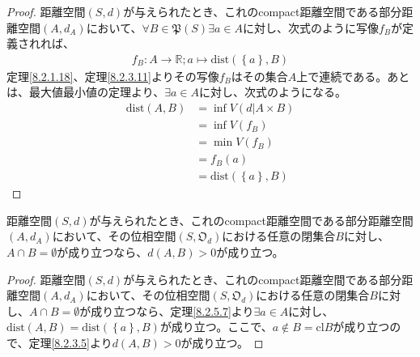 \documentclass[dvipdfmx]{jsarticle}
\begin{document}
\begin{proof}
距離空間$(S,d)$が与えられたとき、これのcompact距離空間である部分距離空間$\left( A,d_{A} \right)$において、$\forall B \in \mathfrak{P}(S)\exists a \in A$に対し、次式のように写像$f_{B}$が定義されれば、
\begin{align*}
f_{B}:A \rightarrow \mathbb{R};a \mapsto \mathrm{dist}\left( \left\{ a \right\},B \right)
\end{align*}
定理\ref{8.2.1.18}、定理\ref{8.2.3.11}よりその写像$f_{B}$はその集合$A$上で連続である。あとは、最大値最小値の定理より、$\exists a \in A$に対し、次式のようになる。
\begin{align*}
\mathrm{dist}(A,B) &= \inf{V\left( d|A \times B \right)}\\
&= \inf{V\left( f_{B} \right)}\\
&= \min{V\left( f_{B} \right)}\\
&= f_{B}(a)\\
&= \mathrm{dist}\left( \left\{ a \right\},B \right)
\end{align*}
\end{proof}
\begin{thm}\label{8.2.5.8}
距離空間$(S,d)$が与えられたとき、これのcompact距離空間である部分距離空間$\left( A,d_{A} \right)$において、その位相空間$\left( S,\mathfrak{O}_{d} \right)$における任意の閉集合$B$に対し、$A \cap B = \emptyset$が成り立つなら、$d(A,B) > 0$が成り立つ。
\end{thm}
\begin{proof}
距離空間$(S,d)$が与えられたとき、これのcompact距離空間である部分距離空間$\left( A,d_{A} \right)$において、その位相空間$\left( S,\mathfrak{O}_{d} \right)$における任意の閉集合$B$に対し、$A \cap B = \emptyset$が成り立つなら、定理\ref{8.2.5.7}より$\exists a \in A$に対し、$\mathrm{dist}(A,B) = \mathrm{dist}\left( \left\{ a \right\},B \right)$が成り立つ。ここで、$a \notin B = {\mathrm{cl}}B$が成り立つので、定理\ref{8.2.3.5}より$d(A,B) > 0$が成り立つ。
\end{proof}
\end{document}
